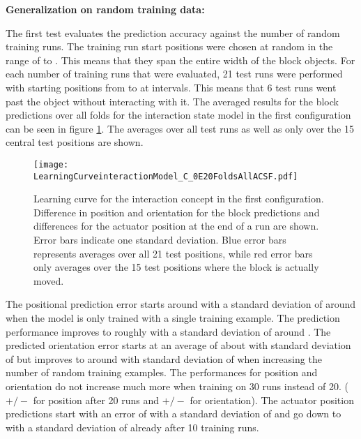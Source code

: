 \textbf{Generalization on random training data:}

The first test evaluates the prediction accuracy against the number of random training runs. The training run start positions were chosen at random in the range of  to . This means that they span the entire width of the block objects.
For each number of training runs that were evaluated, 21 test runs were performed with starting positions from  to  at  intervals. This means that 6 test runs went past the object without interacting with it.
The averaged results for the block predictions over all folds for the interaction state model in the first configuration can be seen in figure \ref{fig:learnCurveInteraction1}. The averages over all test runs as well as only over the 15 central test positions are shown.

\begin{figure}[h]
\centering
\texttt{[image: LearningCurveinteractionModel\_C\_0E20FoldsAllACSF.pdf]}
\caption{Learning curve for the interaction concept in the first configuration. Difference in position and orientation for the block predictions and differences for the actuator position at the end of a run are shown. Error bars indicate one standard deviation. Blue error bars represents averages over all 21 test positions, while red error bars only averages over the 15 test positions where the block is actually moved.}
\label{fig:learnCurveInteraction1}
\end{figure}

The positional prediction error starts around  with a standard deviation of around  when the model is only trained with a single training example. The prediction performance improves to roughly  with a standard deviation of around .
The predicted orientation error starts at an average of about  with standard deviation of  but improves to around  with standard deviation of  when increasing the number of random training examples.
The performances for position and orientation do not increase much more when training on 30 runs instead of 20. ( $+/-$  for position after 20 runs and  $+/-$  for orientation).
The actuator position predictions start with an error of  with a standard deviation of  and go down to  with a standard deviation of  already after 10 training runs.

